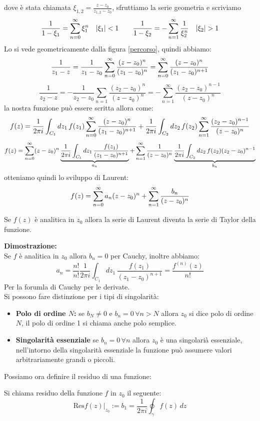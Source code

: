 dove è stata chiamata $\xi_{1,2} = \frac{z-z_0}{z_{1,2}-z_0}$, sfruttiamo la serie geometria e scriviamo
\[\frac{1}{1-\xi_1} = \Sum \xi_1^n \quad |\xi_1|< 1 \qquad \frac{1}{1-\xi_2} = -\sum_{n=1}^\infty \frac{1}{\xi_2^n} \quad |\xi_2|> 1 \]
Lo si vede geometricamente dalla figura \eqref{percorso}, quindi abbiamo:
\[\frac{1}{z_1-z} = \frac{1}{z_1-z_0}\sum_{n=0}^\infty \frac{(z-z_0)^n}{(z_1-z_0)^{n}} =\sum_{n=0}^\infty \frac{(z-z_0)^n}{(z_1-z_0)^{n+1}} \]
\[\frac{1}{z_2-z} = -\frac{1}{z_2-z_0}\sum_{n=1}\frac{(z_2-z_0)^{n}}{(z-z_0)^{n}} =-\sum_{n=1}^{\infty}\frac{(z_2-z_0)^{n-1}}{(z-z_0)^{n}} \]
la nostra funzione può essere scritta allora come:
\[f(z) =\frac{1}{2\pi i}\int_{C_1}dz_1\,f(z_1)\sum_{n=0}^\infty \frac{(z-z_0)^n}{(z_1-z_0)^{n+1}} + \frac{1}{2\pi i}\int_{C_2}dz_2\,f(z_2)\sum_{n=1}^{\infty}\frac{(z_2-z_0)^{n-1}}{(z-z_0)^{n}}\]
\[f(z) =\sum_{n=0}^\infty (z-z_0)^n  \underbrace{\frac{1}{2\pi i}\int_{C_1}dz_1\,\frac{f(z_1)}{(z_1-z_0)^{n+1}}}_{a_n} + \sum_{n=1}^{\infty}\frac{1}{(z-z_0)^{n}}\underbrace{\frac{1}{2\pi i}\int_{C_2}dz_2\,f(z_2)(z_2-z_0)^{n-1}}_{b_n}\]
otteniamo quindi lo sviluppo di Laurent:
\[f(z) = \sum_{n=0}^\infty a_n(z-z_0)^n +\sum_{n=1}^{\infty}\frac{b_n}{(z-z_0)^{n}}\]
\begin{coro}
Se $f(z)$ è analitica in $z_0$ allora la serie di Laurent diventa la serie di Taylor della funzione.
\end{coro}
\hspace{-1.6em}\textbf{Dimostrazione:}\\
Se $f$ è analitica in $z_0$ allora $b_n=0$ per Cauchy, inoltre abbiamo:
\[a_n = \frac{n!}{n!}\frac{1}{2\pi i}\int_{C_1}dz_1\,\frac{f(z_1)}{(z_1-z_0)^{n+1}}= \frac{f^{(n)}(z)}{n!} \]
Per la forumla di Cauchy per le derivate.\\
\newline Si possono fare distinzione per i tipi di singolarità:
\begin{itemize}
\item \textbf{Polo di ordine $N$:} se $b_N \neq 0$ e $b_n=0 \, \forall n>N$ allora $z_0$ si dice polo di ordine $N$, il polo di ordine 1 si chiama anche polo semplice.
\item \textbf{Singolarità essenziale} se $b_n=0\,\forall n$ allora $z_0$ è una singolarià essenziale, nell'intorno della singolarità essenziale la funzione può assumere valori arbitrariamente grandi o piccoli.
\end{itemize}
Possiamo ora definire il residuo di una funzione:
\begin{dfn}
Si chiama residuo della funzione $f$ in $z_0$ il seguente:
\[\text{Res}f(z)\Big|_{z_0} := b_1 = \frac{1}{2\pi i}\oint_\gamma f(z)\,dz\]
\end{dfn}
